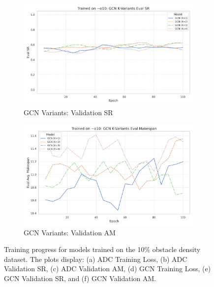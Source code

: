 \begin{figure}[htbp]
    \begin{subfigure}[b]{0.48\textwidth}
        \centering
        \includegraphics[width=\textwidth]{trainplotbase/TRAINED_ON_10_OBS/training_curves_focused/condition_o10/gcn_variants_eval_sr.png}
        \caption{GCN Variants: Validation SR}
        \label{fig:gcn_val_sr_10obs}
    \end{subfigure}
    \hfill
    \begin{subfigure}[b]{0.48\textwidth}
        \centering
        \includegraphics[width=\textwidth]{trainplotbase/TRAINED_ON_10_OBS/training_curves_focused/condition_o10/gcn_variants_eval_am.png}
        \caption{GCN Variants: Validation AM}
        \label{fig:gcn_val_am_10obs}
    \end{subfigure}

    \caption{Training progress for models trained on the 10\% obstacle density dataset. The plots display: (a) ADC Training Loss, (b) ADC Validation SR, (c) ADC Validation AM, (d) GCN Training Loss, (e) GCN Validation SR, and (f) GCN Validation AM. }
    \label{fig:training_curves_10obs_improved}
\end{figure}
\newpage

